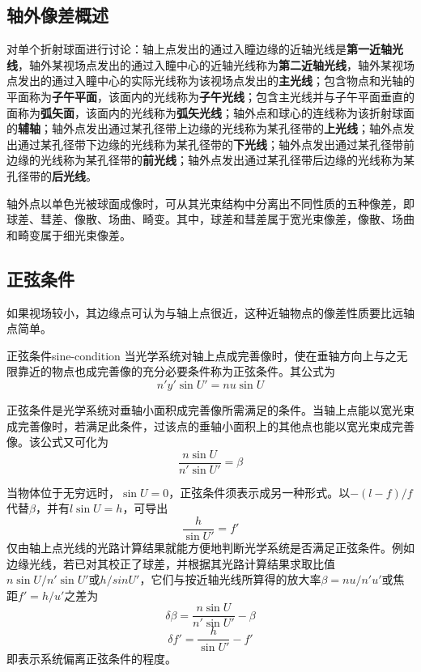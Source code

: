 \subsection{轴外像差概述}
对单个折射球面进行讨论：轴上点发出的通过入瞳边缘的近轴光线是\textbf{第一近轴光线}，轴外某视场点发出的通过入瞳中心的近轴光线称为\textbf{第二近轴光线}，轴外某视场点发出的通过入瞳中心的实际光线称为该视场点发出的\textbf{主光线}；包含物点和光轴的平面称为\textbf{子午平面}，该面内的光线称为\textbf{子午光线}；包含主光线并与子午平面垂直的面称为\textbf{弧矢面}，该面内的光线称为\textbf{弧矢光线}；轴外点和球心的连线称为该折射球面的\textbf{辅轴}；轴外点发出通过某孔径带上边缘的光线称为某孔径带的\textbf{上光线}；轴外点发出通过某孔径带下边缘的光线称为某孔径带的\textbf{下光线}；轴外点发出通过某孔径带前边缘的光线称为某孔径带的\textbf{前光线}；轴外点发出通过某孔径带后边缘的光线称为某孔径带的\textbf{后光线}。
\begin{conclusion}
	轴外点以单色光被球面成像时，可从其光束结构中分离出不同性质的五种像差，即球差、彗差、像散、场曲、畸变。其中，球差和彗差属于宽光束像差，像散、场曲和畸变属于细光束像差。
\end{conclusion}
\subsection{正弦条件}
如果视场较小，其边缘点可认为与轴上点很近，这种近轴物点的像差性质要比远轴点简单。

\begin{definition}{正弦条件}{sine-condition}
	当光学系统对轴上点成完善像时，使在垂轴方向上与之无限靠近的物点也成完善像的充分必要条件称为正弦条件。其公式为
	\begin{equation}
	n'y'\sin U'=nu\sin U
	\end{equation}
\end{definition}

正弦条件是光学系统对垂轴小面积成完善像所需满足的条件。当轴上点能以宽光束成完善像时，若满足此条件，过该点的垂轴小面积上的其他点也能以宽光束成完善像。该公式又可化为
\begin{equation}
\frac{n\sin U}{n'\sin U'}=\beta
\end{equation}

当物体位于无穷远时，$\sin U=0$，正弦条件须表示成另一种形式。以$-(l-f)/f$代替$\beta$，并有$l\sin U=h$，可导出
\begin{equation}
\frac{h}{\sin U'}=f'
\end{equation}
仅由轴上点光线的光路计算结果就能方便地判断光学系统是否满足正弦条件。例如边缘光线，若已对其校正了球差，并根据其光路计算结果求取比值$n\sin U/n'\sin U'$或$h/sin U'$，它们与按近轴光线所算得的放大率$\beta=nu/n'u'$或焦距$f'=h/u'$之差为
\begin{equation}
\delta\beta=\frac{n\sin U}{n'\sin U'}-\beta
\label{eq:delta-beta}
\end{equation}
\begin{equation}
\delta f'=\frac{h}{\sin U'}-f'
\label{eq:delta-f}
\end{equation}
即表示系统偏离正弦条件的程度。

